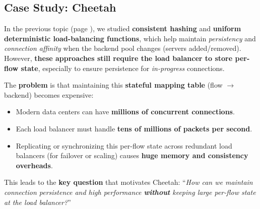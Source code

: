 \subsection{Case Study: Cheetah}

In the previous topic (page \pageref{sec:design-space}), we studied \textbf{consistent hashing} and \textbf{uniform deterministic load-balancing functions}, which help maintain \emph{persistency} and \emph{connection affinity} when the backend pool changes (servers added/removed). However, \textbf{these approaches still require the load balancer to store per-flow state}, especially to ensure persistence for \emph{in-progress} connections.

\highspace
\textcolor{Red2}{} The \textbf{problem} is that maintaining this \textbf{stateful mapping table} (flow $\to$ backend) becomes expensive:
\begin{itemize}
    \item Modern data centers can have \textbf{millions of concurrent connections}.
    \item Each load balancer must handle \textbf{tens of millions of packets per second}.
    \item Replicating or synchronizing this per-flow state across redundant load balancers (for failover or scaling) causes \textbf{huge memory and consistency overheads}.
\end{itemize}
This leads to the \textbf{key question} that motivates Cheetah: ``\emph{How can we maintain connection persistence and high performance \textbf{without} keeping large per-flow state at the load balancer?}''

